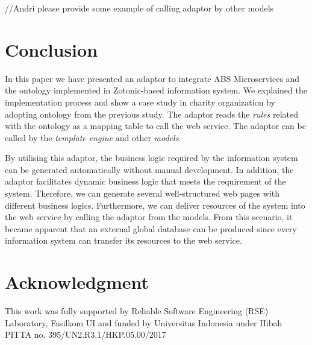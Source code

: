 \documentclass[conference]{IEEEtran}
\begin{document}
//Andri please provide some example of calling adaptor by other models

\section{Conclusion} \label{conclusion}
In this paper we have presented an adaptor to integrate ABS Microservices and the ontology implemented in Zotonic-based information system. We explained the implementation process and show a case study in charity organization by adopting ontology from the previous study. The adaptor reads the \textit{rules} related with the ontology as a mapping table to call the web service. The adaptor can be called by the \textit{template engine} and other \textit{models}.

By utilising this adaptor, the business logic required by the information system can be generated automatically without manual development. In addition, the adaptor facilitates dynamic business logic that meets the requirement of the system. Therefore, we can generate several well-structured web pages with different business logics. Furthermore, we can deliver resources of the system into the web service by calling the adaptor from the models. From this scenario, it became apparent that an external global database can be produced since every information system can transfer its resources to the web service. 

\section*{Acknowledgment}
This work was fully supported by Reliable Software Engineering (RSE) Laboratory, Fasilkom UI and funded by Universitas Indonesia under Hibah PITTA no. 395/UN2.R3.1/HKP.05.00/2017




\end{document}
